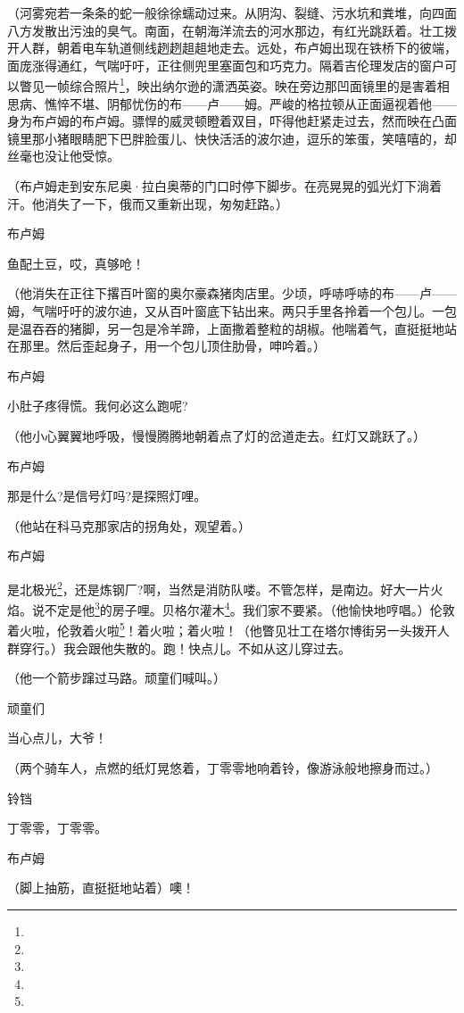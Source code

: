 \par （河雾宛若一条条的蛇一般徐徐蠕动过来。从阴沟、裂缝、污水坑和粪堆，向四面八方发散出污浊的臭气。南面，在朝海洋流去的河水那边，有红光跳跃着。壮工拨开人群，朝着电车轨道侧线趔趔趄趄地走去。远处，布卢姆出现在铁桥下的彼端，面庞涨得通红，气喘吁吁，正往侧兜里塞面包和巧克力。隔着吉伦理发店的窗户可以瞥见一帧综合照片\footnote{}，映出纳尔逊的潇洒英姿。映在旁边那凹面镜里的是害着相思病、憔悴不堪、阴郁忧伤的布——卢——姆。严峻的格拉顿从正面逼视着他——身为布卢姆的布卢姆。骠悍的威灵顿瞪着双目，吓得他赶紧走过去，然而映在凸面镜里那小猪眼睛肥下巴胖脸蛋儿、快快活活的波尔迪，逗乐的笨蛋，笑嘻嘻的，却丝毫也没让他受惊。
\par （布卢姆走到安东尼奥·拉白奥蒂的门口时停下脚步。在亮晃晃的弧光灯下淌着汗。他消失了一下，俄而又重新出现，匆匆赶路。）
\par 布卢姆
\par 鱼配土豆，哎，真够呛！
\par （他消失在正往下撂百叶窗的奥尔豪森猪肉店里。少顷，呼哧呼哧的布——卢——姆，气喘吁吁的波尔迪，又从百叶窗底下钻出来。两只手里各拎着一个包儿。一包是温吞吞的猪脚，另一包是冷羊蹄，上面撒着整粒的胡椒。他喘着气，直挺挺地站在那里。然后歪起身子，用一个包儿顶住肋骨，呻吟着。）
\par 布卢姆
\par 小肚子疼得慌。我何必这么跑呢?
\par （他小心翼翼地呼吸，慢慢腾腾地朝着点了灯的岔道走去。红灯又跳跃了。）
\par 布卢姆
\par 那是什么?是信号灯吗?是探照灯哩。
\par （他站在科马克那家店的拐角处，观望着。）
\par 布卢姆
\par 是北极光\footnote{}，还是炼钢厂?啊，当然是消防队喽。不管怎样，是南边。好大一片火焰。说不定是他\footnote{}的房子哩。贝格尔灌木\footnote{}。我们家不要紧。（他愉快地哼唱。）伦敦着火啦，伦敦着火啦\footnote{}！着火啦；着火啦！（他瞥见壮工在塔尔博街另一头拨开人群穿行。）我会跟他失散的。跑！快点儿。不如从这儿穿过去。
\par （他一个箭步蹿过马路。顽童们喊叫。）
\par 顽童们
\par 当心点儿，大爷！
\par （两个骑车人，点燃的纸灯晃悠着，丁零零地响着铃，像游泳般地擦身而过。）
\par 铃铛
\par 丁零零，丁零零。
\par 布卢姆
\par （脚上抽筋，直挺挺地站着）噢！
